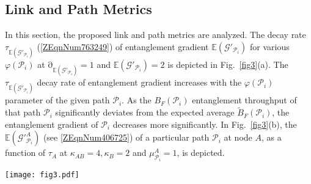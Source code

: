 \documentclass[11pt]{article}%
\newcommand{\fref}[1]{Fig.~\ref{#1}}
\begin{document}
\subsection{Link and Path Metrics}
In this section, the proposed link and path metrics are analyzed. The decay rate ${\tau }_{\mathbb{E}\left({\mathcal{G}}'_{{\mathcal{P}}_i}\right)}$ (\eqref{ZEqnNum763249}) of entanglement gradient $\mathbb{E}\left({\mathcal{G}}'_{{\mathcal{P}}_i}\right)$ for various $\varphi \left({\mathcal{P}}_i\right)$ at ${\mathrm{\partial }}_{\mathbb{E}\left({\mathcal{G}}'_{{\mathcal{P}}_i}\right)}\mathrm{=1}$ and $\mathbb{E}\left({\mathcal{G}}'_{{\mathcal{P}}_i}\right)\mathrm{=2}$ is depicted in \fref{fig3}(a). The ${\tau }_{\mathbb{E}\left({\mathcal{G}}'_{{\mathcal{P}}_i}\right)}$ decay rate of entanglement gradient increases with the $\varphi \left({\mathcal{P}}_i\right)$ parameter of the given path ${\mathcal{P}}_i$. As the $B_F\left({\mathcal{P}}_i\right)$ entanglement throughput of that path ${\mathcal{P}}_i$ significantly deviates from the expected average ${\tilde{B}}_F\left({\mathcal{P}}_i\right)$, the entanglement gradient of ${\mathcal{P}}_i$ decreases more significantly. 
In \fref{fig3}(b), the $\mathbb{E}\left({\mathcal{G}}'^A_{{\mathcal{P}}_i}\right)$ (see \eqref{ZEqnNum406725}) of a particular path ${\mathcal{P}}_i$ at node $A$, as a function of ${\tau }_A$ at ${\kappa }_{AB}\mathrm{=4,}{\kappa }_B\mathrm{=2}$ and ${\mu }^A_{{\mathcal{P}}_i}\mathrm{=1}$, is depicted. \\

\begin{figure*}[h!]
\vspace{-0.6cm}
 \begin{center}
 	 \texttt{[image: fig3.pdf]}

\caption{ \textbf{(a)}: The decay rate ${\tau }_{\mathbb{E}\left({\mathcal{G}}'_{{\mathcal{P}}_i}\right)}$ (log-scale) of entanglement gradient $\mathbb{E}\left({\mathcal{G}}'_{{\mathcal{P}}_i}\right)$ for path ${\mathcal{P}}_i$, $\varphi \left({\mathcal{P}}_i\right)\mathrm{=1}0^0\mathrm{,\dots ,1}0^{\mathrm{8}}$, and $\mathrm{\partial }\mathrm{=1}$, $\mathbb{E}\left({\mathcal{G}}'_{{\mathcal{P}}_i}\right)\mathrm{=2}$. \textbf{(b)}: The $\mathbb{E}\left({\mathcal{G}}'^A_{{\mathcal{P}}_i}\right)$ of a path ${\mathcal{P}}_i$ at node $A$ as a function of ${\tau }_A$ at ${\kappa }_{AB}\mathrm{=4,}{\kappa }_B\mathrm{=2}$ and ${\mu }^A_{{\mathcal{P}}_i}\mathrm{=1}$.}
\label{fig3}
\end{center}
\end{figure*}
\end{document}
